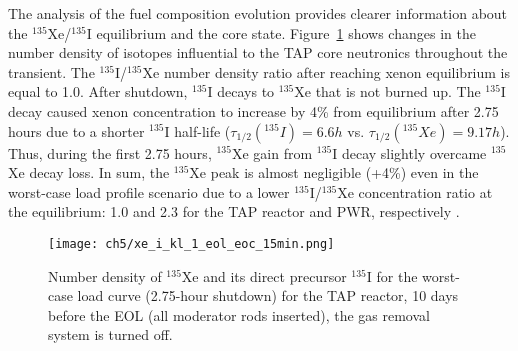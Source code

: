 The analysis of the fuel composition evolution provides clearer information 
about the $^{135}$Xe/$^{135}$I equilibrium and the core state. 
Figure~\ref{fig:lf-tap-xe-i-eol-eoc-no-15} shows changes in the number density 
of isotopes influential to the \gls{TAP} core neutronics throughout the 
transient. The $^{135}$I/$^{135}$Xe number density ratio after reaching xenon
equilibrium is equal to 1.0. After shutdown, $^{135}$I decays to $^{135}$Xe 
that is not burned up. The $^{135}$I decay caused xenon concentration to 
increase by 4\% from equilibrium after 2.75 hours due to a shorter $^{135}$I 
half-life ($\tau_{1/2}(^{135}I)=6.6h$ vs. $\tau_{1/2}(^{135}Xe)=9.17h$). Thus, 
during the first 2.75 hours, $^{135}$Xe gain from $^{135}$I decay slightly 
overcame $^{135}$Xe decay loss. In sum, the $^{135}$Xe peak is almost 
negligible (+4\%) even in the worst-case load profile scenario due to a lower 
$^{135}$I/$^{135}$Xe concentration ratio at the equilibrium: 1.0 and 2.3 for 
the \gls{TAP} reactor and \gls{PWR}, respectively 
\cite{rykhlevskii_impact_2019}.
\begin{figure}[htp!] %
	\centering
	\texttt{[image: ch5/xe\_i\_kl\_1\_eol\_eoc\_15min.png]}
	\caption{Number density of $^{135}$Xe and its direct precursor $^{135}$I 
	for the worst-case load curve (2.75-hour shutdown) for the \gls{TAP} 
	reactor, 10 days before the \gls{EOL} (all moderator rods inserted), the 
	gas removal system is turned off.}
	\label{fig:lf-tap-xe-i-eol-eoc-no-15}
\end{figure}

